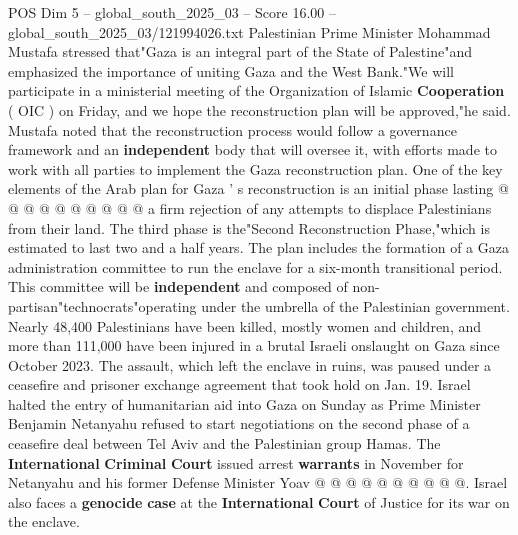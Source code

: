 \begin{textsample}{POS Dim 5 – global\_south\_2025\_03 – Score 16.00 – global\_south\_2025\_03/121994026.txt}
Palestinian Prime Minister Mohammad Mustafa stressed that"Gaza is an integral part of the State of Palestine"and emphasized the importance of uniting Gaza and the West Bank."We will participate in a ministerial meeting of the Organization of Islamic \textbf{Cooperation} ( OIC ) on Friday, and we hope the reconstruction plan will be approved,"he said.
Mustafa noted that the reconstruction process would follow a governance framework and an \textbf{independent} body that will oversee it, with efforts made to work with all parties to implement the Gaza reconstruction plan.
One of the key elements of the Arab plan for Gaza ' s reconstruction is an initial phase lasting @ @ @ @ @ @ @ @ @ @ a firm rejection of any attempts to displace Palestinians from their land.
The third phase is the"Second Reconstruction Phase,"which is estimated to last two and a half years.
The plan includes the formation of a Gaza administration committee to run the enclave for a six-month transitional period.
This committee will be \textbf{independent} and composed of non-partisan"technocrats"operating under the umbrella of the Palestinian government.
Nearly 48,400 Palestinians have been killed, mostly women and children, and more than 111,000 have been injured in a brutal Israeli onslaught on Gaza since October 2023.
The assault, which left the enclave in ruins, was paused under a ceasefire and prisoner exchange agreement that took hold on Jan. 19.
Israel halted the entry of humanitarian aid into Gaza on Sunday as Prime Minister Benjamin Netanyahu refused to start negotiations on the second phase of a ceasefire deal between Tel Aviv and the Palestinian group Hamas.
The \textbf{International} \textbf{Criminal} \textbf{Court} issued arrest \textbf{warrants} in November for Netanyahu and his former Defense Minister Yoav @ @ @ @ @ @ @ @ @ @.
Israel also faces a \textbf{genocide} \textbf{case} at the \textbf{International} \textbf{Court} of Justice for its war on the enclave.

\end{textsample}
